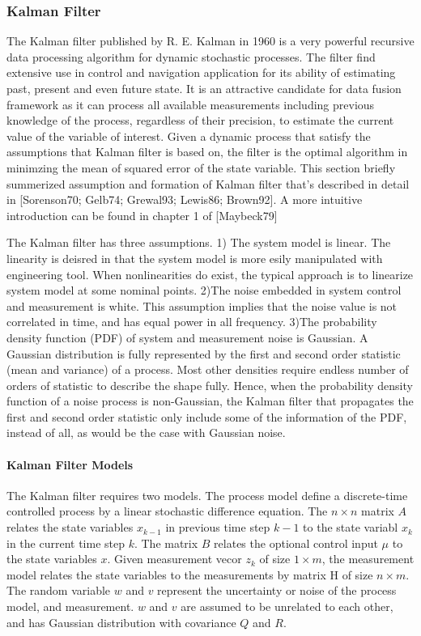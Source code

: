 \subsubsection{Kalman Filter}
The Kalman filter \cite{Kalman's original paper}published by R. E.
Kalman in 1960 is a very powerful recursive data processing algorithm
for dynamic stochastic processes. The filter find extensive use in
control and navigation application for its ability of estimating past,
present and even future state. It is an attractive candidate for data
fusion framework as it can process all available measurements
including previous knowledge of the process, regardless of their
precision, to estimate the current value of the variable of interest.
Given a dynamic process that satisfy the assumptions that Kalman
filter is based on, the filter is the optimal algorithm in minimzing
the mean of squared error of the state variable. This section briefly
summerized assumption and formation of Kalman filter that's described
in detail in \cite{from the following}[Sorenson70; Gelb74; Grewal93;
Lewis86; Brown92]. A more intuitive introduction can be found in
chapter 1 of [Maybeck79]

The Kalman filter has three assumptions. 1) The system model is
linear. The linearity is deisred in that the system model is more
esily manipulated with engineering tool. When nonlinearities do exist,
the typical approach is to linearize system model at some nominal
points. 2)The noise embedded in system control and measurement is
white. This assumption implies that the noise value is not correlated
in time, and has equal power in all frequency. 3)The probability
density function (PDF) of system and measurement noise is Gaussian. A
Gaussian distribution is fully represented by the first and second
order statistic (mean and variance) of a process. Most other densities
require endless number of orders of statistic to describe the shape
fully. Hence, when the probability density function of a noise process
is non-Gaussian, the Kalman filter that propagates the first and
second order statistic only include some of the information of the
PDF, instead of all, as would be the case with Gaussian noise.

\paragraph{Kalman Filter Models}
The Kalman filter requires two models. The process model define a
discrete-time controlled process by a linear stochastic difference
equation. The $n\times n$ matrix $A$ relates the state variables
$x_{k-1}$ in previous time step $k-1$ to the state variabl $x_{k}$ in
the current time step $k$. The matrix $B$ relates the optional control
input $\mu$ to the state variables $x$. Given measurement vecor $z_k$
of size $1 \times m$, the measurement model relates the state
variables to the measurements by matrix H of size $n \times m$. The
random variable $w$ and $v$ represent the uncertainty or noise of the
process model, and measurement. $w$ and $v$ are assumed to be
unrelated to each other, and has Gaussian distribution with covariance
$Q$ and $R$. 


